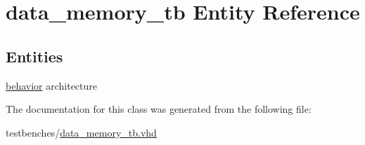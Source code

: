 \hypertarget{classdata__memory__tb}{\section{data\-\_\-memory\-\_\-tb \-Entity \-Reference}
\label{classdata__memory__tb}
}
\subsection*{\-Entities}
\begin{DoxyCompactItemize}
\item 
\hyperlink{classdata__memory__tb_1_1behavior}{behavior} architecture
\end{DoxyCompactItemize}


\-The documentation for this class was generated from the following file\-:\begin{DoxyCompactItemize}
\item 
testbenches/\hyperlink{data__memory__tb_8vhd}{data\-\_\-memory\-\_\-tb.\-vhd}\end{DoxyCompactItemize}
